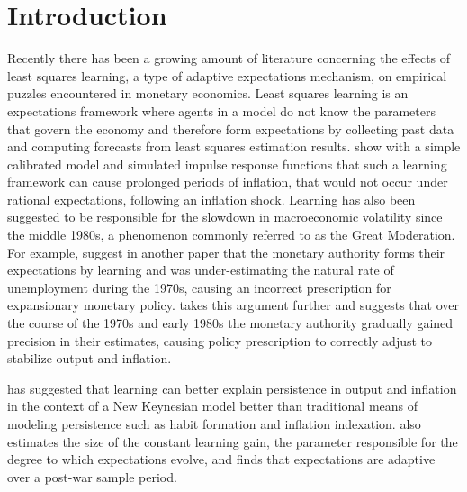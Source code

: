 \section{Introduction}
Recently there has been a growing amount of literature concerning the effects of least squares learning, a type of adaptive expectations mechanism, on empirical puzzles encountered in monetary economics.  Least squares learning is an expectations framework where agents in a model do not know the parameters that govern the economy and therefore form expectations by collecting past data and computing forecasts from least squares estimation results.   show with a simple calibrated model and simulated impulse response functions that such a learning framework can cause prolonged periods of inflation, that would not occur under rational expectations, following an inflation shock.  Learning has also been suggested to be responsible for the slowdown in macroeconomic volatility since the middle 1980s, a phenomenon commonly referred to as the Great Moderation.  For example,  suggest in another paper that the monetary authority forms their expectations by learning and was under-estimating the natural rate of unemployment during the 1970s, causing an incorrect prescription for expansionary monetary policy.   takes this argument further and suggests that over the course of the 1970s and early 1980s the monetary authority gradually gained precision in their estimates, causing policy prescription to correctly adjust to stabilize output and inflation.

 has suggested that learning can better explain persistence in output and inflation in the context of a New Keynesian model better than traditional means of modeling persistence such as habit formation and inflation indexation.   also estimates the size of the constant learning gain, the parameter responsible for the degree to which expectations evolve, and finds that expectations are adaptive over a post-war sample period.  

